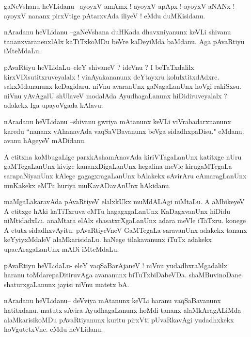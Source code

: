\documentclass{article}
\begin{document}
\begin{mn}%
gaNeVshanu heVLidanu --ayoyxV amAmx ! ayoyxV apApx ! ayoyxV aNANx ! ayoyxV nananx pirxVtige 
pAtarxvAda iliyeV ! eMdu duMKisidanu.
\end{mn}

\begin{mn}%
nAradanu heVLidanu --gaNeVshana duHKada dhavxniyanunx keVLi shivanu tananxvaranenxlAlx 
kaTiTxkoMDu beVre kaDeyiMda baMdanu. Aga pAvaRtiyu iMteMdaLu.
\end{mn}

\begin{mn}%
pAvaRtiyu heVLidaLu--eleY shivaneV ? ideVnu ? I beTaTxdalilx kirxVDisutitxruveyalalx ! 
vinAyakananunx deYtayxru kolulxtitxdAdxre. sakxMdananunx keDagidaru. niVnu avaranUnx 
gaNagaLanUnx hoVgi rakiSxsu. niVnu yAvAgalU shUlaveV modalAda AyudhagaLanunx 
hiDidiruveyalalx ? adakekx Iga upayoVgada kAlavu.
\end{mn}

\begin{mn}%
nAradanu heVLidanu --shivanu gwriya mAtanunx keVLi viVrabadarxnanunx karedu ``nananx 
vAhanavAda vaqSaVBavanunx beVga sidadhxpaDisu." eMdanu. avanu hAgeyeV mADidanu.
\end{mn}

\begin{mn}%
A etitxna koMbugaLige parxkAshamAnavAda kiriVTagaLanUnx katitxge nUru gaMTegaLanUnx kivige 
kananxDigaLanUnx hegalina meVle kirugaMTegaLa sarapaNiyanUnx kAlege gagagxragaLanUnx 
bAlakekx sAvirAru cAmaragLanUnx muKakekx eMTu huriya muKavADavAnUnx hAkidanu.
\end{mn}

\begin{mn}%
maMgaLakaravAda pAvaRtiyeV elalxkUkx muMdALAgi niMtaLu. A aMbikeyeV A etitxge hAki 
kaTiTxruva eMTu hagagxgaLanUnx KaDagxvanUnx hiDidu niMtidadxLu. anaMtara elAlx 
shasatxrXgaLanUnx adara meVle iTaTxru. konege A etutx sidadhxvAyitu. pAvaRtiyeVneV 
GaMTegaLa saravanUnx adakekx tananx keYyiyxMdaleV alaMkarisidaLu. haNege tilakavanunx iTuTx 
adakekx upacAragaLanUnx mADi iMteMdaLu.
\end{mn}

\begin{mn}%
pAvaRtiyu heVLidaLu- eleY vaqSaBarAjaneV ! niVnu yudadhxraMgadalilx haranu 
toMdarepaDitiruvAga avananunx biTuTxbiDabeVDa. shaMBuvinoDane shaturxgaLanunx jayisi niVnu 
matetx bA.
\end{mn}

\begin{mn}%
nAradanu heVLidanu-- deVviya mAtanunx keVLi haranu vaqSaBavanunx hatitxdanu. matutx sAvira 
AyudhagaLanunx hoMdi tananx alaMkAragALiMda alaMkarisikoMDu pAvaRtiyanunx kuritu pirxVti 
pUvaRkavAgi yudadhxkekx hoVgutetxVne. eMdu heVLidanu.
\end{mn}
\end{document}
